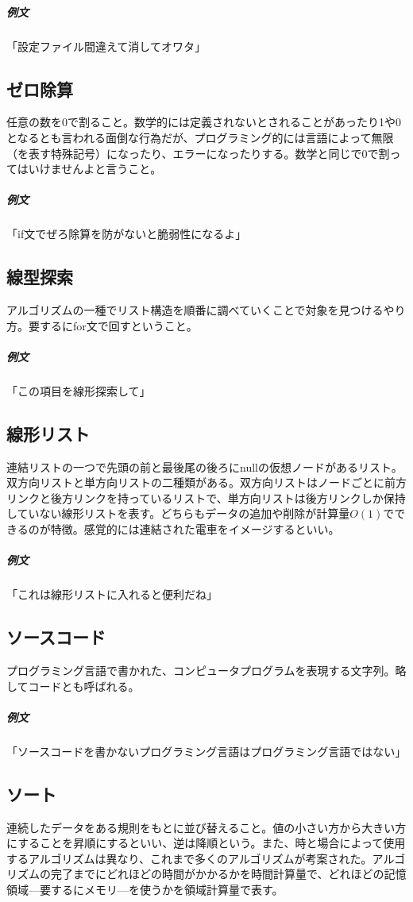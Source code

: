 \documentclass[a4paper]{ltjsreport}
\begin{document}
\subparagraph{例文}「設定ファイル間違えて消してオワタ」

\subsection{ゼロ除算}
任意の数を0で割ること。数学的には定義されないとされることがあったり1や0となるとも言われる面倒な行為だが、プログラミング的には言語によって無限（を表す特殊記号）になったり、エラーになったりする。数学と同じで0で割ってはいけませんよと言うこと。

\subparagraph{例文}「if文でぜろ除算を防がないと脆弱性になるよ」

\subsection{線型探索}
アルゴリズムの一種でリスト構造を順番に調べていくことで対象を見つけるやり方。要するにfor文で回すということ。

\subparagraph{例文}「この項目を線形探索して」

\subsection{線形リスト}
連結リストの一つで先頭の前と最後尾の後ろにnullの仮想ノードがあるリスト。双方向リストと単方向リストの二種類がある。双方向リストはノードごとに前方リンクと後方リンクを持っているリストで、単方向リストは後方リンクしか保持していない線形リストを表す。どちらもデータの追加や削除が計算量$O(1)$でできるのが特徴。感覚的には連結された電車をイメージするといい。

\subparagraph{例文}「これは線形リストに入れると便利だね」

\subsection{ソースコード}
プログラミング言語で書かれた、コンピュータプログラムを表現する文字列。略してコードとも呼ばれる。

\subparagraph{例文}「ソースコードを書かないプログラミング言語はプログラミング言語ではない」

\subsection{ソート}
連続したデータをある規則をもとに並び替えること。値の小さい方から大きい方にすることを昇順にするといい、逆は降順という。また、時と場合によって使用するアルゴリズムは異なり、これまで多くのアルゴリズムが考案された。アルゴリズムの完了までにどれほどの時間がかかるかを時間計算量で、どれほどの記憶領域---要するにメモリ---を使うかを領域計算量で表す。
\end{document}
